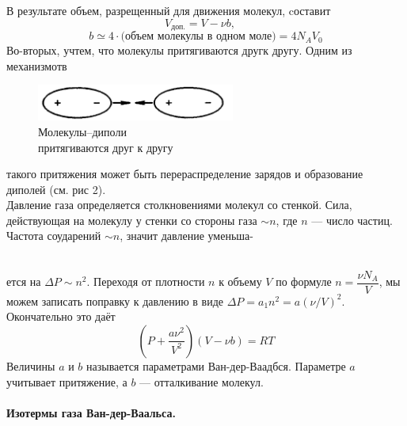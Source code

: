 В результате объем, разрещенный для движения молекул, cоставит
$$V_\text{доп.} =V-\nu b,\quad$$
$$ b\simeq4\cdot\text{(объем молекулы в одном моле)}=4N_AV_0$$
Во-вторых, учтем, что молекулы притягиваются другк другу. Одним из механизмотв 
\begin{minipage}{65mm}
	\begin{figure}[H]
		\label{dipol}
		\includegraphics[width=65mm]{ris19_2.png}
		\caption{Молекулы--диполи \\притягиваются друг к другу}
	\end{figure}
\end{minipage}
\begin{minipage}{5mm}
	\quad
\end{minipage}
\begin{minipage}{100mm}
	такого притяжения может быть перераспределение зарядов и образование диполей (см. рис 2).\\
	Давление газа определяется столкновениями молекул со стенкой. Сила, действующая на молекулу у стенки со стороны газа $\sim n$, где $n$ --- число частиц. Частота соударений $\sim n$, значит давление уменьша-
\end{minipage}\\[1mm]
ется на $\Delta P\sim n^2$. Переходя от плотности $n$ к объему $V$ по формуле $n=\dfrac{\nu N_A}{V}$, мы можем записать поправку к давлению в виде $\Delta P=a_1n^2=a(\nu/V)^2.$ Окончательно это даёт
$$\left(P+\dfrac{a\nu^2}{V^2}\right)\left(V-\nu b\right)=RT$$
Величины $a$ и $b$ называется параметрами Ван-дер-Ваадбся. Параметре $a$ учитывает притяжение, а $b$ --- отталкивание молекул.

\paragraph{Изотермы газа Ван-дер-Ваальса.}
